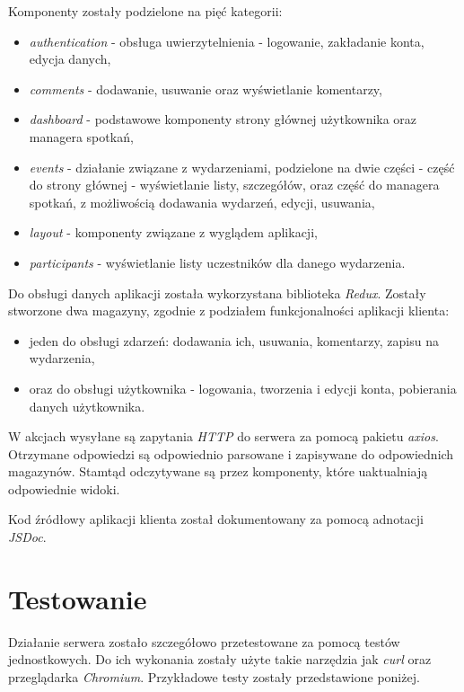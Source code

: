\documentclass[12pt]{article}
\begin{document}
Komponenty zostały podzielone na pięć kategorii:
\begin{itemize}
\item \textit{authentication} - obsługa uwierzytelnienia - logowanie, zakładanie konta, edycja danych,
\item \textit{comments} - dodawanie, usuwanie oraz wyświetlanie komentarzy,
\item \textit{dashboard} - podstawowe komponenty strony głównej użytkownika oraz managera spotkań,
\item \textit{events} - działanie związane z wydarzeniami, podzielone na dwie części - część do strony głównej - wyświetlanie listy, szczegółów, oraz część do managera spotkań, z możliwością dodawania wydarzeń, edycji, usuwania,
\item \textit{layout} - komponenty związane z wyglądem aplikacji,
\item \textit{participants} - wyświetlanie listy uczestników dla danego wydarzenia.
\end{itemize}

Do obsługi danych aplikacji została wykorzystana biblioteka \textit{Redux}. Zostały stworzone dwa magazyny, zgodnie z podziałem funkcjonalności aplikacji klienta: 
\begin{itemize}
\item jeden do obsługi zdarzeń: dodawania ich, usuwania, komentarzy, zapisu na wydarzenia,
\item oraz do obsługi użytkownika - logowania, tworzenia i edycji konta, pobierania danych użytkownika.
\end{itemize}

W akcjach wysyłane są zapytania \textit{HTTP} do serwera za pomocą pakietu \textit{axios}. Otrzymane odpowiedzi są odpowiednio parsowane i zapisywane do odpowiednich magazynów. Stamtąd odczytywane są przez komponenty, które uaktualniają odpowiednie widoki.

Kod źródłowy aplikacji klienta został dokumentowany za pomocą adnotacji \textit{JSDoc}.

\pagebreak
\section{Testowanie}

Działanie serwera zostało szczegółowo przetestowane za pomocą testów jednostkowych. Do ich wykonania zostały użyte takie narzędzia jak \textit{curl} oraz przeglądarka \textit{Chromium}. Przykładowe testy zostały przedstawione poniżej.
\end{document}
